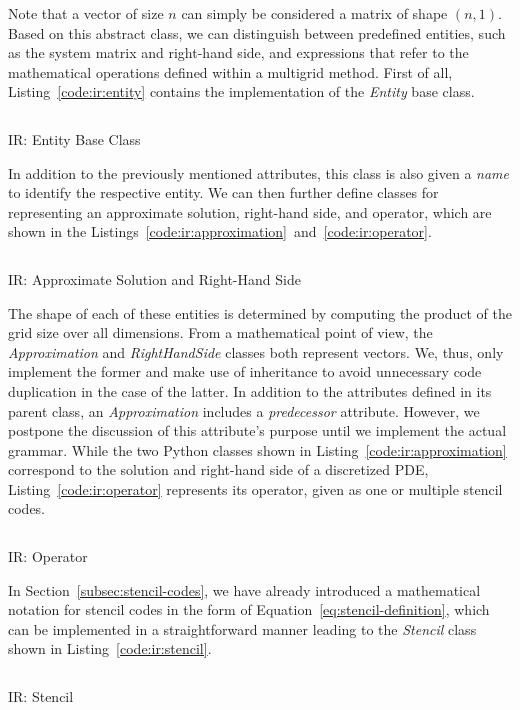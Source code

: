Note that a vector of size $n$ can simply be considered a matrix of shape $(n,1)$.
Based on this abstract class, we can distinguish between predefined entities, such as the system matrix and right-hand side, and expressions that refer to the mathematical operations defined within a multigrid method.
First of all, Listing~\ref{code:ir:entity} contains the implementation of the \emph{Entity} base class.
\begin{listing}
	\inputminted{python}{evostencils/ir/entity.py}
	\caption{IR: Entity Base Class}
	\label{code:ir:entity}
\end{listing}
In addition to the previously mentioned attributes, this class is also given a \emph{name} to identify the respective entity.
We can then further define classes for representing an approximate solution, right-hand side, and operator, which are shown in the Listings~\ref{code:ir:approximation}~and~\ref{code:ir:operator}.
\begin{listing}
	\inputminted{python}{evostencils/ir/approximation.py}
	\caption{IR: Approximate Solution and Right-Hand Side}
	\label{code:ir:approximation}
\end{listing}
The shape of each of these entities is determined by computing the product of the grid size over all dimensions.
From a mathematical point of view, the \emph{Approximation} and \emph{RightHandSide} classes both represent vectors.
We, thus, only implement the former and make use of inheritance to avoid unnecessary code duplication in the case of the latter.
In addition to the attributes defined in its parent class, an \emph{Approximation} includes a \emph{predecessor} attribute.
However, we postpone the discussion of this attribute's purpose until we implement the actual grammar.
While the two Python classes shown in Listing~\ref{code:ir:approximation} correspond to the solution and right-hand side of a discretized PDE, Listing~\ref{code:ir:operator} represents its operator, given as one or multiple stencil codes.
\begin{listing}
	\inputminted{python}{evostencils/ir/operator.py}
	\caption{IR: Operator}
	\label{code:ir:operator}
\end{listing}
In Section~\ref{subsec:stencil-codes}, we have already introduced a mathematical notation for stencil codes in the form of Equation~\eqref{eq:stencil-definition}, which can be implemented in a straightforward manner leading to the \emph{Stencil} class shown in Listing~\ref{code:ir:stencil}.
\begin{listing}
	\inputminted{python}{evostencils/ir/stencil.py}
	\caption{IR: Stencil}
	\label{code:ir:stencil}
\end{listing}
